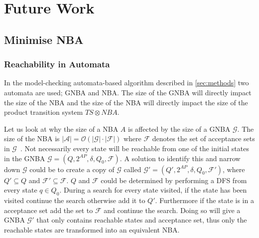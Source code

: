 \section{Future Work}\label{sec:future-work}
\subsection{Minimise NBA}
\cite{fritz2002state, hopcroft1971n, kan2016partial}
\subsubsection{Reachability in Automata}
In the model-checking automata-based algorithm described in \autoref{sec:methods} two automata are used; GNBA and NBA. The size of the GNBA will directly impact the size of the NBA and the size of the NBA will directly impact the size of the product transition system $TS \otimes NBA$. 

Let us look at why the size of a NBA $A$ is affected by the size of a GNBA $\mathcal{G}$. The size of the NBA is $|\mathcal{A}| = \mathcal{O}(|\mathcal{G}| \cdot |\mathcal{F}|)$ where $\mathcal{F}$ denotes the set of acceptance sets in $\mathcal{G}$~\cite[thm. 4.56]{baier2008principles}. 
Not necessarily every state will be reachable from one of the initial states in the GNBA $\mathcal{G}=(Q,2^{AP},\delta,Q_0,\mathcal{F})$. A solution to identify this and narrow down $\mathcal{G}$ could be to create a copy of $\mathcal{G}$ called $\mathcal{G}'=(Q',2^{AP},\delta,Q_0,\mathcal{F}')$, where $Q' \subseteq Q$ and $\mathcal{F}' \subseteq \mathcal{F}$. $Q$ and $\mathcal{F}$ could be determined by performing a DFS from every state $q \in Q_0$. During a search for every state visited, if the state has been visited continue the search otherwise add it to $Q'$. Furthermore if the state is in a acceptance set add the set to $\mathcal{F}$ and continue the search. Doing so will give a GNBA $\mathcal{G}'$ that only contains reachable states and acceptance set, thus only the reachable states are transformed into an equivalent NBA.

